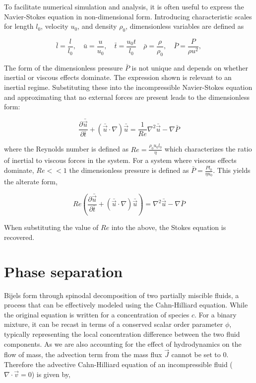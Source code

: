 To facilitate numerical simulation and analysis, it is often useful to express the Navier-Stokes equation in non-dimensional form. Introducing characteristic scales for length 
$l_0$, velocity $u_0$, and density $\rho_0$, dimensionless variables are defined as

\begin{equation}
    \bar{l} = \frac{l}{l_0}, \quad \bar{u} = \frac{u}{u_0}, \quad \bar{t} = \frac{u_0 t}{l_0} \quad \bar{\rho} = \frac{\rho}{\rho_0}, \quad \bar{P} = \frac{P}{\rho u^2}, 
\end{equation}

The form of the dimensionless pressure $\bar{P}$ is not unique and depends on whether inertial or viscous effects dominate. The expression shown is 
relevant to an inertial regime. Substituting these into the incompressible Navier-Stokes equation and approximating that no external forces are present 
leads to the dimensionless form:

\begin{equation}
    \frac{\partial \bar{\vec{u}}}{\partial \bar{t}} + (\bar{\vec{u}} \cdot\nabla)\bar{\vec{u}} = \frac{1}{Re} \nabla^2 \bar{\vec{u}} - \nabla\bar{P}
\end{equation}

where the Reynolds number is defined as $Re = \frac{\rho_0 u_0 l_0}{\eta}$ which characterizes the ratio of inertial to viscous forces in the system. For a system
where viscous effects dominate, $Re << 1$ the dimensionless pressure is defined as $\bar{P} = \frac{P l_0}{\eta u_0}$. This yields the alterate form,

\begin{equation}
    Re\left( \frac{\partial \bar{\vec{u}}}{\partial \bar{t}} + (\bar{\vec{u}} \cdot\nabla)\bar{\vec{u}}  \right) = \nabla^2 \bar{\vec{u}} - \nabla\bar{P}
\end{equation}

When substituting the value of $Re$ into the above, the Stokes equation is recovered.

\section{Phase separation}

Bijels form through spinodal decomposition of two partially miscible fluids, a process that can be effectively modeled using the Cahn-Hilliard equation. \cite{cahn_spinodal_1961} While the
original equation is written for a concentration of species $c$. For a binary mixture, it can be recast in terms of a conserved scalar order parameter $\phi$, typically representing the 
local concentration difference between the two fluid components. As we are also accounting for the effect of hydrodynamics on the flow of mass, the advection term
from the mass flux $\vec{J}$ cannot be set to 0. Therefore the advective Cahn-Hilliard equation of an incompressible fluid ($\nabla \cdot \vec{v} = 0$) is given by,

